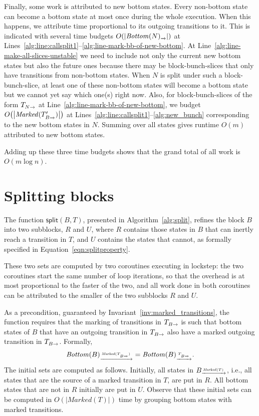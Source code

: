\documentclass[a4paper,10pt]{article}
\theoremstyle{definition}
\theoremstyle{plain}
\newcommand{\bigo}[1]{{O\!\left(#1\right)}}
\newcommand{\pijl}[1]{\mathrel{\text{$\xrightarrow{\smash[t]{#1}}$}}}
\newcommand{\size}[1]{\left\lvert #1 \right\rvert}
\newcommand{\TB}{T_{B\pijl{}}}
\newcommand{\Bottom}{\mathit{Bottom}}
\newcommand{\Marked}{\mathit{Marked}}
\begin{document}
Finally, some work is attributed to new bottom states.
Every non-bottom state can become a bottom state at most once during the whole execution.
When this happens, we attribute time proportional to its outgoing transitions to it.
This is indicated with several time budgets $\bigo{\size{\Bottom(N)_{\pijl{}}}}$ at Lines~\ref{alg:line:callsplit1}--\ref{alg:line-mark-bb-of-new-bottom}.
At Line~\ref{alg:line-make-all-slices-unstable} we need to include not only the current new bottom states but also the future ones
because there may be block-bunch-slices that only have transitions from non-bottom states.
When $N$ is split under such a block-bunch-slice, at least one of these non-bottom states will become a bottom state
but we cannot yet say which one(s) right now.
Also, for block-bunch-slices of the form $T_{N\pijl{}}$ at Line~\ref{alg:line-mark-bb-of-new-bottom},
we budget $\bigo{\size{\Marked(\TB')}}$ at Lines~\ref{alg:line:callsplit1}--\ref{alg:new_bunch} corresponding to the new bottom states in $N$.
Summing over all states gives runtime $\bigo{m}$
attributed to new bottom states.

Adding up these three time budgets shows that the grand total of all work is  $\bigo{m \log n}$.

\section{Splitting blocks}
\label{sec:splitting_blocks}

The function $\mathsf{split}(B,T)$, presented in Algorithm~\ref{alg:split}, refines the block $B$ into two subblocks, $R$ and $U$,
where $R$ contains those states in $B$ that can inertly reach a transition in $T$,
and $U$ contains the states that cannot,
as formally specified in Equation~\eqref{eqn:splitproperty}.

These two sets are computed by two coroutines executing in lockstep:
the two coroutines start the same number of loop iterations,
so that the overhead is at most proportional to the faster of the two,
and all work done in both coroutines can be attributed to the smaller of the two subblocks $R$ and $U$.

As a precondition, guaranteed by Invariant~\ref{inv:marked_transitions},
the function requires that the marking of transitions in $\TB$ is such
that bottom states of $B$ that have an outgoing transition in $\TB$ also have a marked outgoing transition in $\TB$.
Formally,
\begin{equation*}
\Bottom(B)_{\pijl{\Marked(\TB)}} = \Bottom(B)_{\pijl{\TB}}.
\end{equation*}
The initial sets are computed as follows.
Initially, all states in $B_{\pijl{\Marked(T)}}$,
i.e., all states that are the source of a marked transition in $T$, are put in $R$.
All bottom states that are not in $R$ initially are put in $U$.
Observe that these initial sets can be computed in $\bigo{\size{\Marked(T)}}$ time
by grouping bottom states with marked transitions.
\end{document}
